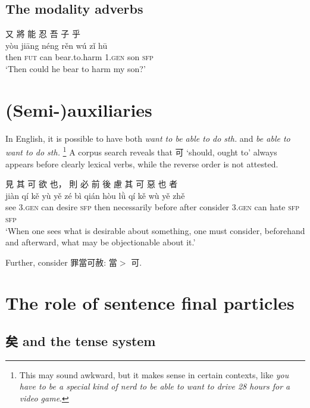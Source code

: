 \documentclass[UTF8, a4paper, oneside, scheme=plain, 12pt]{ctexrep}
\newcommand*{\textgt}{$>$ }
\newcommand{\form}[1]{\emph{#1}}
\newcommand{\translate}[1]{`#1'}
\newcommand*{\category}[1]{\textsc{#1}}
\begin{document}
\subsection{The modality adverbs}

\begin{exe}
    \ex\label{ex:tam.adverb.low-modality.1}
    \glll 又 將 能 忍 吾 子 乎 \\
    yòu jiāng néng rěn wú zǐ hū \\
    then \category{fut} can bear.to.harm 1.\category{gen} son \category{sfp} \\
    \glt\translate{Then could he bear to harm my son?}
\end{exe}

\section{(Semi-)auxiliaries}

In English, it is possible to have both \form{want to be able to do sth.} 
and \form{be able to want to do sth.}%
\footnote{
    This may sound awkward, but it makes sense in certain contexts, like 
    \form{you have to be a special kind of nerd to be able to want to drive 28 hours for a video game}.
}
A corpus search reveals that 可 \translate{should, ought to} always appears before clearly lexical verbs,
while the reverse order is not attested.

\begin{exe}
    \ex
    \glll 見 其 可 欲 也， 則 必 前 後 慮 其 可 惡 也 者 \\
    jiàn qí kě yù yě zé bì qián hòu lǜ qí kě wù yě zhě \\
    see 3.\category{gen} can desire \category{sfp} then necessarily before after consider 3.\category{gen} can hate \category{sfp} \category{sfp} \\
    \glt\translate{When one sees what is desirable about something, one must consider, beforehand and afterward, what may be objectionable about it.}
\end{exe}

Further, consider 罪當可赦: 當\textgt 可.

\section{The role of sentence final particles}\label{sec:tam.sfp}

\subsection{矣 and the tense system}\label{sec:tam.sfp.yi}
\end{document}
